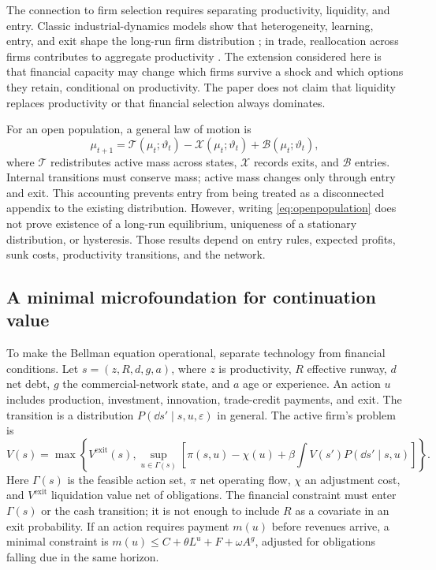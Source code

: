 \documentclass[11pt,a4paper]{article}
\begin{document}
The connection to firm selection requires separating productivity, liquidity, and entry. Classic industrial-dynamics models show that heterogeneity, learning, entry, and exit shape the long-run firm distribution \citep{jovanovic1982,hopenhayn1992}; in trade, reallocation across firms contributes to aggregate productivity \citep{melitz2003}. The extension considered here is that financial capacity may change which firms survive a shock and which options they retain, conditional on productivity. The paper does not claim that liquidity replaces productivity or that financial selection always dominates.

For an open population, a general law of motion is
\begin{equation}
\mu_{t+1}=\mathcal T(\mu_t;\vartheta_t)-\mathcal X(\mu_t;\vartheta_t)+\mathcal B(\mu_t;\vartheta_t),
\label{eq:openpopulation}
\end{equation}
where $\mathcal T$ redistributes active mass across states, $\mathcal X$ records exits, and $\mathcal B$ entries. Internal transitions must conserve mass; active mass changes only through entry and exit. This accounting prevents entry from being treated as a disconnected appendix to the existing distribution. However, writing \eqref{eq:openpopulation} does not prove existence of a long-run equilibrium, uniqueness of a stationary distribution, or hysteresis. Those results depend on entry rules, expected profits, sunk costs, productivity transitions, and the network.

\subsection{A minimal microfoundation for continuation value}
To make the Bellman equation operational, separate technology from financial conditions. Let $s=(z,R,d,g,a)$, where $z$ is productivity, $R$ effective runway, $d$ net debt, $g$ the commercial-network state, and $a$ age or experience. An action $u$ includes production, investment, innovation, trade-credit payments, and exit. The transition is a distribution $P(\dd s'\mid s,u,\varepsilon)$ in general. The active firm's problem is
\begin{equation}
V(s)=\max\left\{V^{\mathrm{exit}}(s),\sup_{u\in\Gamma(s)}\left[\pi(s,u)-\chi(u)+\beta\int V(s')P(\dd s'\mid s,u)\right]\right\}.
\label{eq:bellman_micro}
\end{equation}
Here $\Gamma(s)$ is the feasible action set, $\pi$ net operating flow, $\chi$ an adjustment cost, and $V^{\mathrm{exit}}$ liquidation value net of obligations. The financial constraint must enter $\Gamma(s)$ or the cash transition; it is not enough to include $R$ as a covariate in an exit probability. If an action requires payment $m(u)$ before revenues arrive, a minimal constraint is $m(u)\leq C+\theta L^u+F+\omega A^g$, adjusted for obligations falling due in the same horizon.
\end{document}
